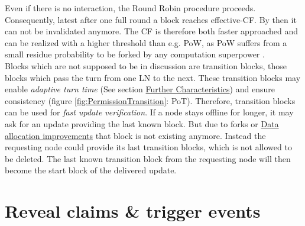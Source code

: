 Even if there is no interaction, the Round Robin procedure proceeds.
Consequently, latest after one full round a block reaches effective-\gls{CF}.
By then it can not be invalidated anymore.
The \gls{CF} is therefore both faster approached and can be realized with a higher threshold than e.g. \gls{PoW},
as \gls{PoW} suffers from a small residue probability to be forked by any computation superpower \cite[4]{Demi.2021}. \\
Blocks which are not supposed to be in discussion are transition blocks, those blocks which pass the turn from one \gls{LN} to the next.
These transition blocks may enable \textit{adaptive turn time} (See section \hyperref[sec:FurtherCharacteristics]{Further Characteristics}) and ensure consistency (figure \ref{fig:PermissionTransition}: PoT).
Therefore, transition blocks can be used for \textit{fast update verification}.
If a node stays offline for longer, it may ask for an update providing the last known block.
But due to forks or \hyperref[sec:DataAllocationImprovements]{Data allocation improvements} that block is not existing anymore.
Instead the requesting node could provide its last transition blocks, which is not allowed to be deleted.
The last known transition block from the requesting node will then become the start block of the delivered update.



\FloatBarrier

\section{Reveal claims \& trigger events}
\label{sec:ClaimsAndTriggers}

